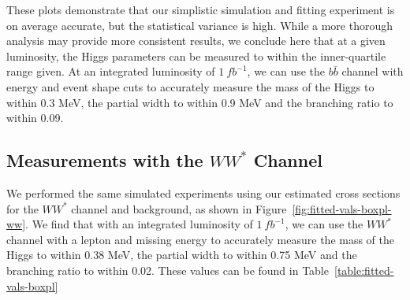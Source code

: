 \documentclass[a4paper]{article}
\begin{document}
These plots demonstrate that our simplistic simulation and fitting experiment is on average accurate, but the statistical variance is high. While a more thorough analysis may provide more consistent results, we conclude here that at a given luminosity, the Higgs parameters can be measured to within the inner-quartile range given. At an integrated luminosity of $1~fb^{-1}$, we can use the $b\bar{b}$ channel with energy and event shape cuts to accurately measure the mass of the Higgs to within 0.3 MeV, the partial width to within 0.9 MeV and the branching ratio to within 0.09.

\subsection{Measurements with the $WW^*$ Channel}
We performed the same simulated experiments using our estimated cross sections for the $WW^*$ channel and background, as shown in Figure~\ref{fig:fitted-vals-boxpl-ww}. We find that with an integrated luminosity of $1~fb^{-1}$, we can use the $WW^*$ channel with a lepton and missing energy to accurately measure the mass of the Higgs to within 0.38 MeV, the partial width to within 0.75 MeV and the branching ratio to within 0.02. These values can be found in Table~\ref{table:fitted-vals-boxpl}
\end{document}
